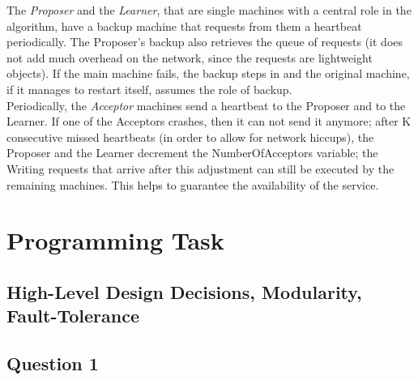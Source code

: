 \documentclass[paper=a4, fontsize=11pt]{scrartcl} %
\numberwithin{equation}{section} %
\numberwithin{figure}{section} %
\numberwithin{table}{section} %
\begin{document}
The \textit{Proposer} and the \textit{Learner}, that are single machines with a central role in the algorithm, have a backup machine that requests from them a heartbeat periodically. The Proposer's backup also retrieves the queue of requests (it does not add much overhead on the network, since the requests are lightweight objects). If the main machine fails, the backup steps in and the original machine, if it manages to restart itself, assumes the role of backup.\\
Periodically, the \textit{Acceptor} machines send a heartbeat to the Proposer and to the Learner. If one of the Acceptors crashes, then it can not send it anymore; after K consecutive missed heartbeats (in order to allow for network hiccups), the Proposer and the Learner decrement the NumberOfAcceptors variable; the Writing requests that arrive after this adjustment can still be executed by the remaining machines. This helps to guarantee the availability of the service.\\

\clearpage
\section{Programming Task}

\subsection{High-Level Design Decisions, Modularity, Fault-Tolerance}

\subsection{Question 1} 
\end{document}

